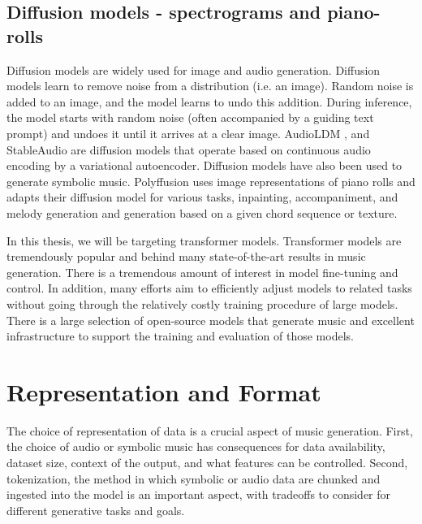 \subsection{Diffusion models - spectrograms and piano-rolls}
Diffusion models are widely used for image and audio generation. Diffusion models learn to remove noise from a distribution (i.e. an image). Random noise is added to an image, and the model learns to undo this addition. During inference, the model starts with random noise (often accompanied by a guiding text prompt) and undoes it until it arrives at a clear image. AudioLDM \cite{Liu_Chen_Yuan_Mei_Liu_Mandic_Wang_Plumbley_2023}, and StableAudio \cite{Evans_Parker_Carr_Zukowski_Taylor_Pons_2024} are diffusion models that operate based on continuous audio encoding by a variational autoencoder. Diffusion models have also been used to generate symbolic music. Polyffusion \cite{Min_Jiang_Xia_Zhao_polyffusion_2023} uses image representations of piano rolls and adapts their diffusion model for various tasks, inpainting, accompaniment, and melody generation and generation based on a given chord sequence or texture. 

In this thesis, we will be targeting transformer models. Transformer models are tremendously popular and behind many state-of-the-art results in music generation. There is a tremendous amount of interest in model fine-tuning and control. In addition, many efforts aim to efficiently adjust models to related tasks without going through the relatively costly training procedure of large models. There is a large selection of open-source models that generate music and excellent infrastructure to support the training and evaluation of those models. 

\section{Representation and Format}\label{representation}
The choice of representation of data is a crucial aspect of music generation. First, the choice of audio or symbolic music has consequences for data availability, dataset size, context of the output, and what features can be controlled. Second, tokenization, the method in which symbolic or audio data are chunked and ingested into the model is an important aspect, with tradeoffs to consider for different generative tasks and goals. 


